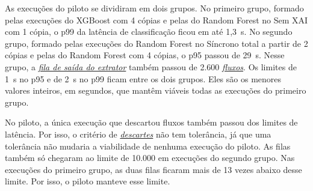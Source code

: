 \documentclass[
  12pt,
  oneside,
  a4paper,
  chapter=TITLE,
  sumario=tradicional,
  english,
  brazil
]{abntex2}
\newcommand{\termo}[2]{\hyperref[gl:#1]{\emph{#2}}}
\begin{document}
\begin{apendicesenv}
As execuções do piloto se dividiram em dois grupos. No primeiro grupo, formado pelas execuções do
XGBoost com 4 cópias e pelas do Random Forest no Sem XAI com 1 cópia, o p99 da latência de
classificação ficou em até 1,3~s. No segundo grupo, formado pelas execuções do Random Forest no
Síncrono total a partir de 2 cópias e pelas do Random Forest com 4 cópias, o p95 passou de 29~s.
Nesse grupo, a \termo{fila-extrator}{fila de saída do extrator} também passou de 2.600
\termo{fluxo}{fluxos}. Os limites de 1~s no p95 e de 2~s no p99 ficam entre os dois grupos. Eles
são os menores valores inteiros, em segundos, que mantêm viáveis todas as execuções do primeiro
grupo.

No piloto, a única execução que descartou fluxos também passou dos limites de latência. Por isso,
o critério de \termo{descarte}{descartes} não tem tolerância, já que uma tolerância não mudaria a
viabilidade de nenhuma execução do piloto. As filas também só chegaram ao limite de 10.000 em
execuções do segundo grupo. Nas execuções do primeiro grupo, as duas filas ficaram mais de 13
vezes abaixo desse limite. Por isso, o piloto manteve esse limite.

\end{apendicesenv}
\end{document}
